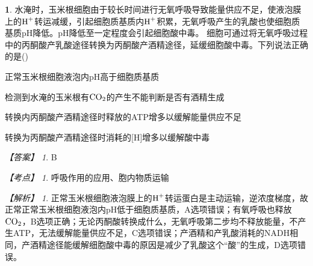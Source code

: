 \documentclass[UTF8, 10pt, a4paper, oneside]{ctexart}
\theoremstyle{definition}
\newtheorem{exercise}{}
\theoremstyle{remark}
\newtheorem*{answer}{【答案】}
\newtheorem*{point}{【考点】}      %
\newtheorem*{explanation}{【解析】}     %
\theoremstyle{plain}
\begin{document}
\begin{exercise}
水淹时，玉米根细胞由于较长时间进行无氧呼吸导致能量供应不足，使液泡膜上的$\ce{H+}$转运减缓，引起细胞质基质内$\ce{H+}$积累，无氧呼吸产生的乳酸也使细胞质基质pH降低。pH降低至一定程度会引起细胞酸中毒。
细胞可通过将无氧呼吸过程中的丙酮酸产乳酸途径转换为丙酮酸产酒精途径，延缓细胞酸中毒。下列说法正确的是\quad(\quad)
    \begin{adjustwidth}{2em}{}
            \begin{asparaenum}[A. ]
                \item 正常玉米根细胞液泡内pH高于细胞质基质
                \item 检测到水淹的玉米根有$\ce{CO2}$的产生不能判断是否有酒精生成
                \item 转换内丙酮酸产酒精途径时释放的ATP增多以缓解能量供应不足
                \item 转换为丙酮酸产酒精途径时消耗的[H]增多以缓解酸中毒
            \end{asparaenum}
    \end{adjustwidth}
    \begin{answer}
        B
    \end{answer}
    \begin{point}
        呼吸作用的应用、胞内物质运输
    \end{point}
    \begin{explanation}
        正常玉米根细胞液泡膜上的$\ce{H+}$转运蛋白是主动运输，逆浓度梯度，故正常正常玉米根细胞液泡内pH低于细胞质基质，A选项错误；有氧呼吸也释放$\ce{CO2}$，B选项正确；无论丙酮酸转换成什么，无氧呼吸第二步均不释放能量，不产生ATP，无法缓解能量供应不足，C选项错误；产酒精和产乳酸消耗的NADH相同，产酒精途径能缓解细胞酸中毒的原因是减少了乳酸这个“酸”的生成，D选项错误。
    \end{explanation}
\end{exercise}
\end{document}
